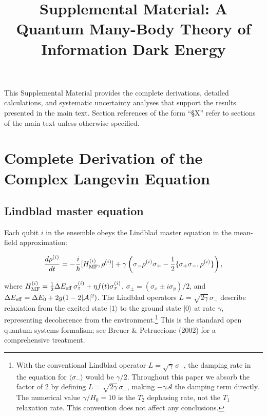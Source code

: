 \documentclass[aps,prd,onecolumn]{revtex4-2}
\begin{document}
\title{Supplemental Material: A Quantum Many-Body Theory of Information Dark Energy}

\maketitle

This Supplemental Material provides the complete derivations, detailed calculations, and systematic uncertainty analyses that support the results presented in the main text. Section references of the form ``\S X'' refer to sections of the main text unless otherwise specified.

\section{Complete Derivation of the Complex Langevin Equation}

\subsection{Lindblad master equation}

Each qubit $i$ in the ensemble obeys the Lindblad master equation in the mean-field approximation:

\begin{equation}
\frac{d\rho^{(i)}}{dt} = -\frac{i}{\hbar}[H_{\rm MF}^{(i)}, \rho^{(i)}] + \gamma\left(\sigma_-\rho^{(i)}\sigma_+ - \frac{1}{2}\{\sigma_+\sigma_-, \rho^{(i)}\}\right),
\label{sm:lindblad}
\end{equation}

where $H_{\rm MF}^{(i)} = \frac{1}{2}\Delta E_{\rm eff}\,\sigma_z^{(i)} + \eta f(t)\sigma_x^{(i)}$, $\sigma_\pm = (\sigma_x \pm i\sigma_y)/2$, and $\Delta E_{\rm eff} = \Delta E_0 + 2g(1-2|\mathcal{A}|^2)$. The Lindblad operators $L = \sqrt{2\gamma}\,\sigma_-$ describe relaxation from the excited state $|1\rangle$ to the ground state $|0\rangle$ at rate $\gamma$, representing decoherence from the environment.\footnote{With the conventional Lindblad operator $L = \sqrt{\gamma}\,\sigma_-$, the damping rate in the equation for $\langle\sigma_-\rangle$ would be $\gamma/2$. Throughout this paper we absorb the factor of 2 by defining $L = \sqrt{2\gamma}\,\sigma_-$, making $- \gamma \mathcal{A}$ the damping term directly. The numerical value $\gamma/H_0 = 10$ is the $T_2$ dephasing rate, not the $T_1$ relaxation rate. This convention does not affect any conclusions.} This is the standard open quantum systems formalism; see Breuer \& Petruccione (2002) for a comprehensive treatment.
\end{document}
